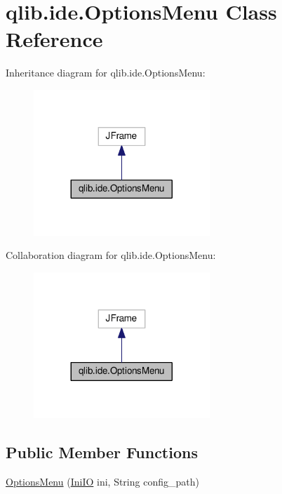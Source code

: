 \hypertarget{classqlib_1_1ide_1_1OptionsMenu}{}\section{qlib.\+ide.\+Options\+Menu Class Reference}
\label{classqlib_1_1ide_1_1OptionsMenu}


Inheritance diagram for qlib.\+ide.\+Options\+Menu\+:
\nopagebreak
\begin{figure}[H]
\begin{center}
\leavevmode
\includegraphics[width=188pt]{classqlib_1_1ide_1_1OptionsMenu__inherit__graph}
\end{center}
\end{figure}


Collaboration diagram for qlib.\+ide.\+Options\+Menu\+:
\nopagebreak
\begin{figure}[H]
\begin{center}
\leavevmode
\includegraphics[width=188pt]{classqlib_1_1ide_1_1OptionsMenu__coll__graph}
\end{center}
\end{figure}
\subsection*{Public Member Functions}
\begin{DoxyCompactItemize}
\item 
\hyperlink{classqlib_1_1ide_1_1OptionsMenu_a51481ab49936fea97fbf021ae7b37a13}{Options\+Menu} (\hyperlink{classqlib_1_1ide_1_1IniIO}{Ini\+IO} ini, String config\+\_\+path)
\end{DoxyCompactItemize}


